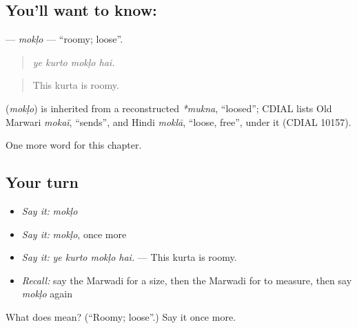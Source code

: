 \subsection*{You'll want to know: }
\textbf{} — \emph{mokḷo} — \textquotedblleft{}roomy; loose\textquotedblright{}.

\begin{quote}
   
\end{quote}

\begin{quote}
\emph{ye kurto mokḷo hai.}
\end{quote}

\begin{quote}
This kurta is roomy.
\end{quote}

\begin{cousinweb}
\textbf{} (\emph{mokḷo}) is inherited from a reconstructed \emph{*mukna}, \textquotedblleft{}loosed\textquotedblright{}; CDIAL lists Old Marwari \emph{mokaï}, \textquotedblleft{}sends\textquotedblright{}, and Hindi \emph{moklā}, \textquotedblleft{}loose, free\textquotedblright{}, under it (CDIAL 10157).
\end{cousinweb}

\begin{grammarlens}[title={What you've built}]
One more word for this chapter.
\end{grammarlens}

\subsection*{Your turn}
\begin{itemize}
\raggedright
  \item \emph{Say it:} \emph{mokḷo}
  \item \emph{Say it:} \emph{mokḷo}, once more
  \item \emph{Say it:} \emph{ye kurto mokḷo hai.} — This kurta is roomy.
  \item \emph{Recall:} say the Marwadi for a size, then the Marwadi for to measure, then say \emph{mokḷo} again
\end{itemize}

\begin{tcolorbox}[breakable,colback=teal!4,colframe=teal!35!black,title={Before you move on}]
What does  mean? (\textquotedblleft{}Roomy; loose\textquotedblright{}.) Say it once more.
\end{tcolorbox}
